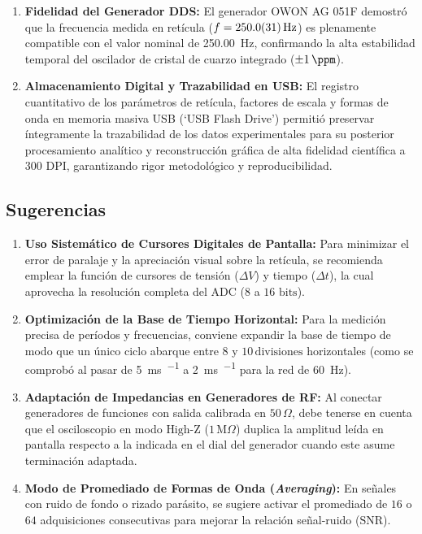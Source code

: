 \begin{enumerate}
    \item \textbf{Fidelidad del Generador DDS:}
    El generador OWON AG 051F demostró que la frecuencia medida en retícula ($f = \qty{250,0 \pm 3,1}{\hertz}$) es plenamente compatible con el valor nominal de \qty{250,00}{\hertz}, confirmando la alta estabilidad temporal del oscilador de cristal de cuarzo integrado ($\pm\qty{1}{\ppm}$).

    \item \textbf{Almacenamiento Digital y Trazabilidad en USB:}
    El registro cuantitativo de los parámetros de retícula, factores de escala y formas de onda en memoria masiva USB (`USB Flash Drive') permitió preservar íntegramente la trazabilidad de los datos experimentales para su posterior procesamiento analítico y reconstrucción gráfica de alta fidelidad científica a 300 DPI, garantizando rigor metodológico y reproducibilidad.
\end{enumerate}

\subsection{Sugerencias}
\begin{enumerate}
    \item \textbf{Uso Sistemático de Cursores Digitales de Pantalla:}
    Para minimizar el error de paralaje y la apreciación visual sobre la retícula, se recomienda emplear la función de cursores de tensión ($\Delta V$) y tiempo ($\Delta t$), la cual aprovecha la resolución completa del ADC ($8$ a $16\text{ bits}$).
    
    \item \textbf{Optimización de la Base de Tiempo Horizontal:}
    Para la medición precisa de períodos y frecuencias, conviene expandir la base de tiempo de modo que un único ciclo abarque entre $8$ y $10\,\text{divisiones}$ horizontales (como se comprobó al pasar de \qty{5}{\milli\second\per\division} a \qty{2}{\milli\second\per\division} para la red de \qty{60}{\hertz}).

    \item \textbf{Adaptación de Impedancias en Generadores de RF:}
    Al conectar generadores de funciones con salida calibrada en $50\,\Omega$, debe tenerse en cuenta que el osciloscopio en modo $\text{High-Z}$ ($1\,\text{M}\Omega$) duplica la amplitud leída en pantalla respecto a la indicada en el dial del generador cuando este asume terminación adaptada.

    \item \textbf{Modo de Promediado de Formas de Onda (\textit{Averaging}):}
    En señales con ruido de fondo o rizado parásito, se sugiere activar el promediado de $16$ o $64$ adquisiciones consecutivas para mejorar la relación señal-ruido ($\text{SNR}$).
\end{enumerate}

